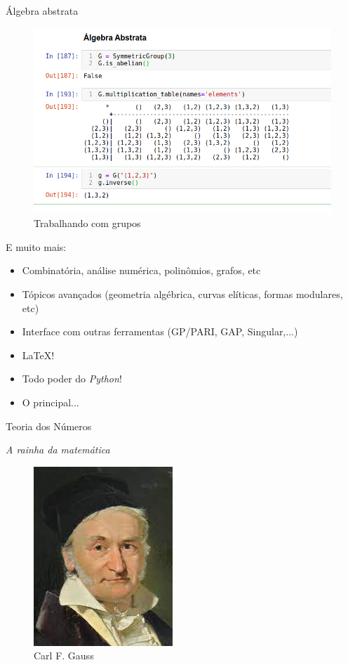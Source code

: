 \documentclass[12pt]{beamer}
\begin{document}
\begin{frame}
  {Álgebra abstrata}
  \begin{figure}[h]
    \centering
    \includegraphics[scale=0.42]{img/abstrata01.png}
    \caption{Trabalhando com grupos}
    \label{img:abstrata01}
  \end{figure}
\end{frame}


\begin{frame}
{E muito mais:}
\begin{itemize}
  \item Combinatória, análise numérica, polinômios, grafos, etc
  \item Tópicos avançados (geometria algébrica, curvas elíticas, formas modulares, etc)
  \item Interface com outras ferramentas (GP/PARI, GAP, Singular,...)
  \item \LaTeX!
  \item Todo poder do \textit{Python}!
  \item O principal...
\end{itemize}
\end{frame}

\begin{frame}
\begin{center}
    {\Large Teoria dos Números}

    \vspace{0.8cm}
    
    \textit{A rainha da matemática}
  \end{center}
  \begin{figure}[h]
    \centering
    \includegraphics[scale=0.4]{img/gauss.jpeg}
    \caption{Carl F. Gauss}
    \label{img:label}
  \end{figure}
\end{frame}
\end{document}
